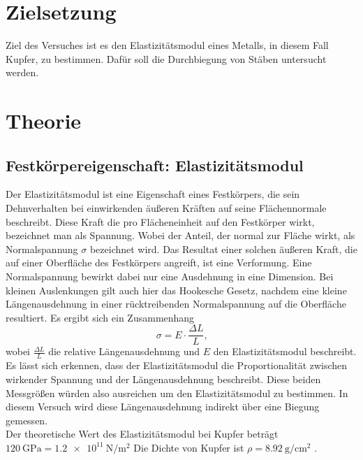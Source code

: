 \section{Zielsetzung}
Ziel des Versuches ist es den Elastizitätsmodul eines Metalls, in diesem Fall Kupfer,
zu bestimmen. Dafür soll die Durchbiegung von Stäben untersucht werden.
\section{Theorie}
\label{sec:Theorie}
\subsection{Festkörpereigenschaft: Elastizitätsmodul}
Der Elastizitätsmodul ist eine Eigenschaft eines Festkörpers, die sein Dehnverhalten bei einwirkenden äußeren Kräften
auf seine Flächennormale beschreibt. Diese Kraft die pro Flächeneinheit auf den Festkörper wirkt, bezeichnet man
als Spannung. Wobei der Anteil, der normal zur Fläche wirkt, als Normalspannung $\sigma$ bezeichnet wird. Das Resultat einer solchen äußeren
Kraft, die auf einer Oberfläche des Festkörpers angreift, ist eine Verformung. Eine Normalspannung bewirkt dabei nur eine Ausdehnung in eine Dimension.
Bei kleinen Auslenkungen gilt auch hier das Hookesche Gesetz, nachdem eine kleine Längenausdehnung in einer rücktreibenden Normalspannung
auf die Oberfläche resultiert. Es ergibt sich ein Zusammenhang 
\begin{equation}
    \sigma=E\cdot \frac{\Delta L}{L} \text{,}
    \label{eq:Hook}
\end{equation}
wobei $\frac{\Delta L}{L}$ die relative Längenausdehnung und $E$ den Elastizitätsmodul beschreibt. Es lässt sich erkennen,
dass der Elastizitätsmodul die Proportionalität zwischen wirkender Spannung und der Längenausdehnung beschreibt.
Diese beiden Messgrößen würden also ausreichen um den Elastizitätsmodul zu bestimmen. In diesem Versuch wird diese Längenausdehnung
indirekt über eine Biegung gemessen.\\
\noindent Der theoretische Wert des Elastizitätsmodul bei Kupfer beträgt $\qty{120}{\giga\pascal}=\qty{1.2e11}{\newton\per\meter\squared}$
Die Dichte von  Kupfer ist $\rho=\qty{8.92}{\gram\per\centi\meter\squared}$ \cite{Tabellen}.
